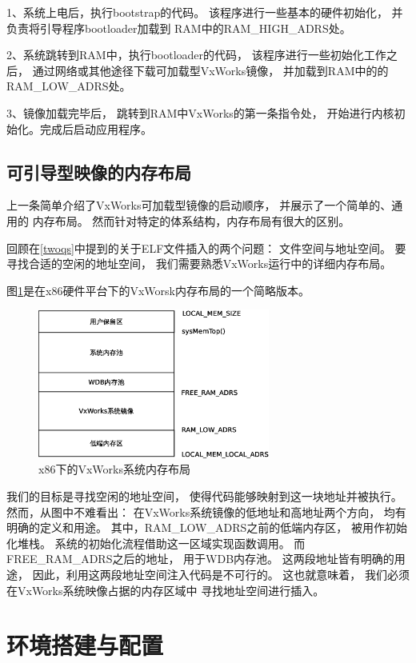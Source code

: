 1、系统上电后，执行bootstrap的代码。
该程序进行一些基本的硬件初始化，
并负责将引导程序bootloader加载到
RAM中的RAM\_HIGH\_ADRS处。

2、系统跳转到RAM中，执行bootloader的代码，
该程序进行一些初始化工作之后，
通过网络或其他途径下载可加载型VxWorks镜像，
并加载到RAM中的的RAM\_LOW\_ADRS处。

3、镜像加载完毕后，
跳转到RAM中VxWorks的第一条指令处，
开始进行内核初始化。完成后启动应用程序。


\subsection{可引导型映像的内存布局}

上一条简单介绍了VxWorks可加载型镜像的启动顺序，
并展示了一个简单的、通用的
内存布局。
然而针对特定的体系结构，内存布局有很大的区别。

回顾在\ref{twoqs}中提到的关于ELF文件插入的两个问题：
文件空间与地址空间。
要寻找合适的空闲的地址空间，
我们需要熟悉VxWorks运行中的详细内存布局。

图\ref{ram}是在x86硬件平台下的VxWorsk内存布局的一个简略版本。

\begin{figure}[h!]
    \centering
    \includegraphics[width=0.68\textwidth]{figure/ram.eps}
    \caption{x86下的VxWorks系统内存布局}
    \label{ram}
\end{figure}

我们的目标是寻找空闲的地址空间，
使得代码能够映射到这一块地址并被执行。
然而，从图中不难看出：
在VxWorks系统镜像的低地址和高地址两个方向，
均有明确的定义和用途。
其中，RAM\_LOW\_ADRS之前的低端内存区，
被用作初始化堆栈。
系统的初始化流程借助这一区域实现函数调用。
而FREE\_RAM\_ADRS之后的地址，
用于WDB内存池。
这两段地址皆有明确的用途，
因此，利用这两段地址空间注入代码是不可行的。
这也就意味着，
我们必须在VxWorks系统映像占据的内存区域中
寻找地址空间进行插入。


\section{环境搭建与配置}

